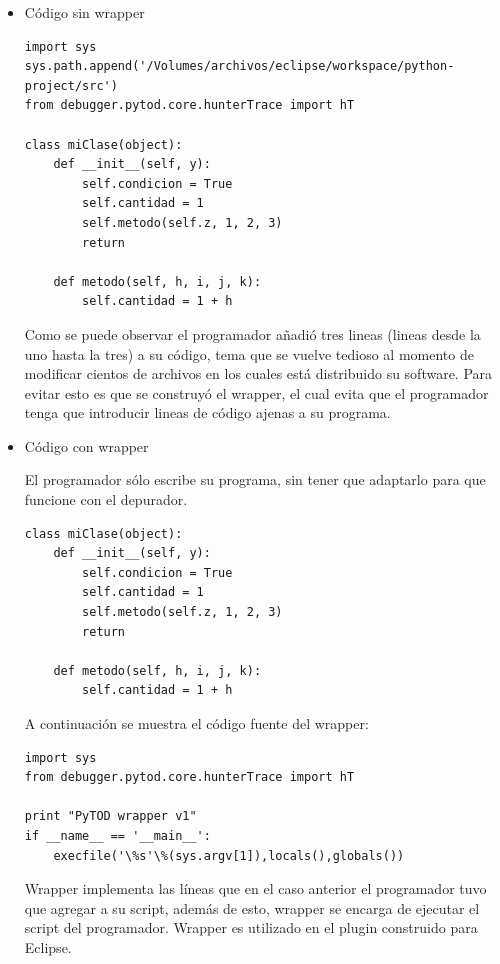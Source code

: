 \documentclass[12pt,legalpaper]{report}
\begin{document}
\begin{itemize}
	\item Código sin wrapper
\begin{singlespace}
\begin{lstlisting}[style=Python]
import sys
sys.path.append('/Volumes/archivos/eclipse/workspace/python-project/src')
from debugger.pytod.core.hunterTrace import hT

class miClase(object):
    def __init__(self, y):
        self.condicion = True
        self.cantidad = 1
        self.metodo(self.z, 1, 2, 3)
        return
    
    def metodo(self, h, i, j, k):
        self.cantidad = 1 + h
\end{lstlisting}
\end{singlespace}

Como se puede observar el programador añadió tres lineas (lineas desde la uno hasta la tres) a su código, tema que se vuelve tedioso al momento de modificar cientos de archivos en los cuales está distribuido su software.  Para evitar esto es que se construyó el wrapper, el cual evita que el programador tenga que introducir lineas de código ajenas a su programa.  

	\item Código con wrapper

El programador sólo escribe su programa, sin tener que adaptarlo para que funcione con el depurador.

\begin{singlespace}
\begin{lstlisting}[style=Python]
class miClase(object):
    def __init__(self, y):
        self.condicion = True
        self.cantidad = 1
        self.metodo(self.z, 1, 2, 3)
        return
    
    def metodo(self, h, i, j, k):
        self.cantidad = 1 + h       
\end{lstlisting}
\end{singlespace}

A continuación se muestra el código fuente del wrapper:
	
\begin{singlespace}
\begin{lstlisting}[style=Python]
import sys
from debugger.pytod.core.hunterTrace import hT

print "PyTOD wrapper v1"
if __name__ == '__main__':
    execfile('\%s'\%(sys.argv[1]),locals(),globals())
\end{lstlisting}
\end{singlespace}

Wrapper implementa las líneas que en el caso anterior el programador tuvo que agregar a su script, además de esto, wrapper se encarga de ejecutar el script del programador.  Wrapper es utilizado en el plugin construido para Eclipse.
\end{itemize}
\end{document}
